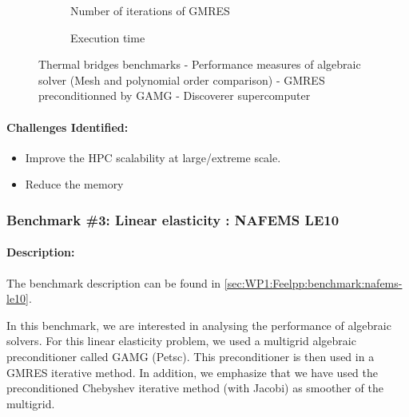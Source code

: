 \begin{figure}
  \begin{subfigure}[c]{\textwidth}
    \centering
    \caption{Number of iterations of GMRES}
  \end{subfigure}
  \begin{subfigure}[c]{\textwidth}
    \centering
    \caption{Execution time}
  \end{subfigure}
  \caption{Thermal bridges benchmarks - Performance measures of algebraic solver
    (Mesh and polynomial order comparison) - GMRES preconditionned by GAMG - Discoverer supercomputer}
  \label{fig:feelpp:wp3:thermal_bridges:performance_measure_all}
\end{figure}


\paragraph{Challenges Identified:} %

\begin{itemize}
\item Improve the HPC scalability at large/extreme scale.
\item Reduce the memory
\end{itemize}

\subsubsection{Benchmark \#3: Linear elasticity : NAFEMS LE10}
\label{sec:WP3:Feelpp:benchmark:nafems-le10}

\paragraph{Description:} %
The benchmark description can be found in
\cref{sec:WP1:Feelpp:benchmark:nafems-le10}.

In this benchmark, we are interested in analysing the performance of algebraic
solvers. For this linear elasticity problem, we used a multigrid algebraic
preconditioner called GAMG (Petsc). This preconditioner is then used in a GMRES
iterative method. In addition, we emphasize that we have used the preconditioned
Chebyshev iterative method (with Jacobi) as smoother of the multigrid.


